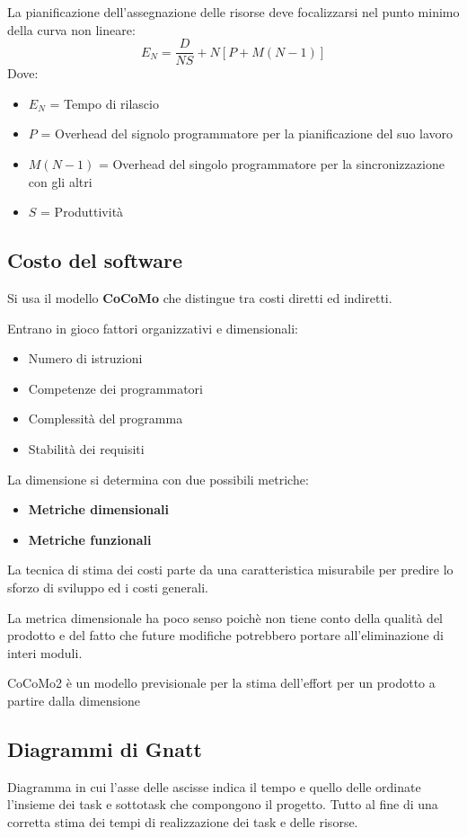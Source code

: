 \documentclass{report}
\begin{document}
\noindent
La pianificazione dell'assegnazione delle risorse deve focalizzarsi nel punto minimo della curva non lineare:
$$E_N = \dfrac{D}{NS} + N\left[P+M(N-1)\right]$$
Dove:
\begin{itemize}
    \item $E_N$ = Tempo di rilascio
    \item $P$ = Overhead del signolo programmatore per la pianificazione del suo lavoro
    \item $M(N-1)$ = Overhead del singolo programmatore per la sincronizzazione con gli altri
    \item $S$ = Produttività
\end{itemize}

\subsection*{Costo del software}
Si usa il modello \textbf{CoCoMo} che distingue tra costi diretti ed indiretti.

\noindent
Entrano in gioco fattori organizzativi e dimensionali:
\begin{itemize}
    \item Numero di istruzioni
    \item Competenze dei programmatori
    \item Complessità del programma
    \item Stabilità dei requisiti
\end{itemize}

\noindent
La dimensione si determina con due possibili metriche:
\begin{itemize}
    \item \textbf{Metriche dimensionali}
    \item \textbf{Metriche funzionali}
\end{itemize}

\newpage
\noindent
La tecnica di stima dei costi parte da una caratteristica misurabile per predire lo sforzo di sviluppo ed i costi generali.

\noindent
La metrica dimensionale ha poco senso poichè non tiene conto della qualità del prodotto e del fatto che future modifiche potrebbero portare all'eliminazione di interi moduli.

\medskip
\noindent
CoCoMo2 è un modello previsionale per la stima dell'effort per un prodotto a partire dalla dimensione

\subsection*{Diagrammi di Gnatt}
Diagramma in cui l'asse delle ascisse indica il tempo e quello delle ordinate l'insieme dei task e sottotask che compongono il progetto. Tutto al fine di una corretta stima dei tempi di realizzazione dei task e delle risorse.
\end{document}

